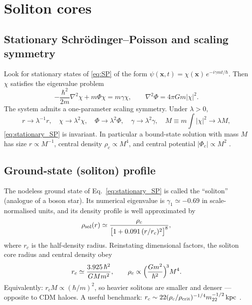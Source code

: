 \documentclass[12pt]{article}
\newcommand{\bx}{\mathbf{x}}
\newcommand{\kpc}{\,\mathrm{kpc}}
\newcommand{\mtwtwo}{m_{22}}
\begin{document}
\section{Soliton cores}
\label{sec:soliton}

\subsection{Stationary Schr\"odinger--Poisson and scaling symmetry}

Look for stationary states of \eqref{eq:SP} of the form
$\psi(\bx,t) = \chi(\bx)\,e^{-i\gamma m t/\hbar}$.  Then $\chi$
satisfies the eigenvalue problem
%
\begin{equation}
  -\frac{\hbar^2}{2m}\nabla^2\chi + m\Phi\chi = m\gamma\chi,
  \qquad
  \nabla^2\Phi = 4\pi G m|\chi|^2.
  \label{eq:stationary_SP}
\end{equation}
%
The system admits a one-parameter scaling symmetry.  Under
$\lambda>0$,
%
\begin{equation}
  r\to\lambda^{-1}r,
  \quad
  \chi\to\lambda^2\chi,
  \quad
  \Phi\to\lambda^2\Phi,
  \quad
  \gamma\to\lambda^2\gamma,
  \quad
  M \equiv m\!\int|\chi|^2\to\lambda M,
  \label{eq:soliton_scaling}
\end{equation}
%
\eqref{eq:stationary_SP} is invariant.  In particular a bound-state
solution with mass $M$ has size $r\propto M^{-1}$, central density
$\rho_c\propto M^4$, and central potential
$|\Phi_c|\propto M^2$ \citep{Marsh2016,Hui2017}.

\subsection{Ground-state (soliton) profile}

The nodeless ground state of Eq.~\eqref{eq:stationary_SP} is called
the ``soliton'' (analogue of a boson star).  Its numerical eigenvalue
is $\gamma_1\simeq -0.69$ in scale-normalised units, and its density
profile is well approximated by \citep{Schive2014}
%
\begin{equation}
  \rho_{\rm sol}(r) \simeq
  \frac{\rho_c}{\bigl[1 + 0.091\,(r/r_c)^2\bigr]^8},
  \label{eq:soliton_fit}
\end{equation}
%
where $r_c$ is the half-density radius.  Reinstating dimensional
factors, the soliton core radius and central density obey
%
\begin{equation}
  r_c \simeq \frac{3.925\,\hbar^2}{G M m^2},
  \qquad
  \rho_c \propto \Bigl(\frac{Gm^2}{\hbar^2}\Bigr)^{\!3} M^4.
  \label{eq:soliton_scaling_dim}
\end{equation}
%
Equivalently: $r_c M \propto (\hbar/m)^2$, so heavier solitons are
smaller and denser --- opposite to CDM haloes.  A useful benchmark:
$r_c \sim 22 (\rho_c/\rho_{\rm crit})^{-1/4} \mtwtwo^{-1/2}\kpc$
\citep{Marsh2016}.
\end{document}
